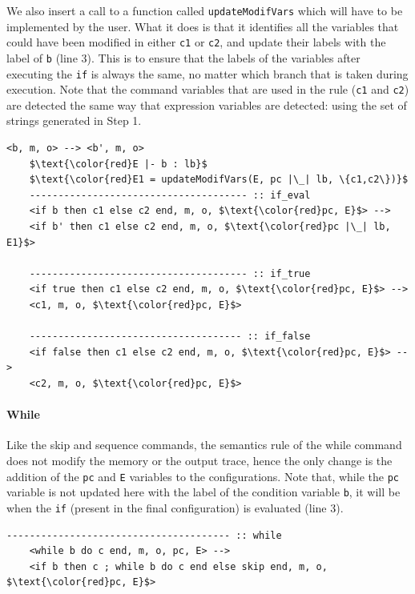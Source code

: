 \documentclass[conference]{IEEEtran}
\begin{document}
We also insert a call to a function called \lstinline{updateModifVars} which will have to be implemented by the user. What it does is that it identifies all the variables that could have been modified in either \lstinline{c1} or \lstinline{c2}, and update their labels with the label of \lstinline{b} (line 3). This is to ensure that the labels of the variables after executing the \lstinline{if} is always the same, no matter which branch that is taken during execution. Note that the command variables that are used in the rule (\lstinline{c1} and \lstinline{c2}) are detected the same way that expression variables are detected: using the set of strings generated in Step 1.
\begin{lstlisting}[label=listing:output-semantics-if,numbers=right,captionpos=b,caption=Ott-IFC's output for the "if" command]
	<b, m, o> --> <b', m, o>
	$\text{\color{red}E |- b : lb}$
	$\text{\color{red}E1 = updateModifVars(E, pc |\_| lb, \{c1,c2\})}$
	-------------------------------------- :: if_eval
	<if b then c1 else c2 end, m, o, $\text{\color{red}pc, E}$> --> 
	<if b' then c1 else c2 end, m, o, $\text{\color{red}pc |\_| lb, E1}$>
	
	-------------------------------------- :: if_true
	<if true then c1 else c2 end, m, o, $\text{\color{red}pc, E}$> --> 
	<c1, m, o, $\text{\color{red}pc, E}$>
	
	------------------------------------- :: if_false
	<if false then c1 else c2 end, m, o, $\text{\color{red}pc, E}$> --> 
	<c2, m, o, $\text{\color{red}pc, E}$>
\end{lstlisting}

\paragraph{While} Like the skip and sequence commands, the semantics rule of the while command does not modify the memory or the output trace, hence the only change is the addition of the \lstinline{pc} and \lstinline{E} variables to the configurations. Note that, while the \lstinline{pc} variable is not updated here with the label of the condition variable \lstinline{b}, it will be when the \lstinline{if} (present in the final configuration) is evaluated (line 3). 
\begin{lstlisting}[label=listing:output-semantics-while,numbers=right,captionpos=b,caption=Ott-IFC's output for the "while" command]
	--------------------------------------- :: while
	<while b do c end, m, o, pc, E> --> 
	<if b then c ; while b do c end else skip end, m, o, $\text{\color{red}pc, E}$>
\end{lstlisting}
\end{document}
